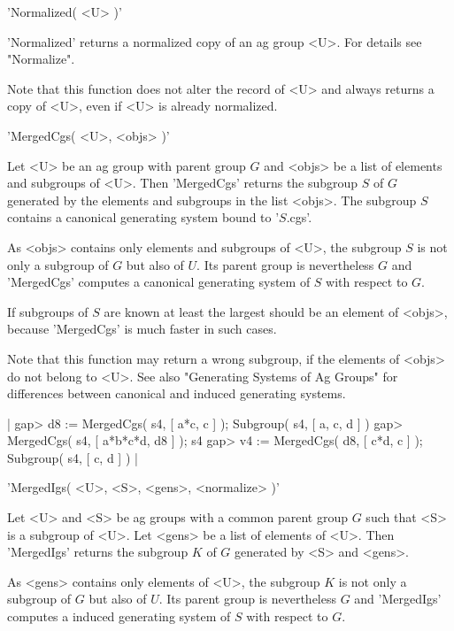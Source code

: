 
'Normalized( <U> )'

'Normalized' returns a normalized copy of  an  ag group <U>.  For details
see "Normalize".

Note that this  function does  not  alter  the record  of <U> and  always
returns a copy of <U>, even if <U> is already normalized.


'MergedCgs( <U>, <objs> )'

Let  <U> be an ag group  with parent group  $G$ and <objs>  be  a list of
elements and subgroups of <U>.  Then 'MergedCgs' returns the subgroup $S$
of $G$ generated  by  the elements and subgroups  in the list <objs>. The
subgroup $S$ contains a canonical generating system bound to '$S$.cgs'.

As <objs> contains only elements and subgroups  of <U>, the  subgroup $S$
is not only  a subgroup of $G$  but also  of  $U$.  Its  parent  group is
nevertheless $G$ and  'MergedCgs' computes a canonical  generating system
of $S$ with respect to $G$.

If subgroups of $S$ are known at least  the largest  should be an element
of <objs>, because 'MergedCgs' is much faster in such cases.

Note that this function may return a wrong subgroup,  if  the elements of
<objs> do not belong to <U>.  See also "Generating  Systems of Ag Groups"
for differences between canonical and induced generating systems.

|    gap> d8 := MergedCgs( s4, [ a*c, c ] );
    Subgroup( s4, [ a, c, d ] )
    gap> MergedCgs( s4, [ a*b*c*d, d8 ] );
    s4
    gap> v4 := MergedCgs( d8, [ c*d, c ] );
    Subgroup( s4, [ c, d ] ) |


'MergedIgs( <U>, <S>, <gens>, <normalize> )'

Let <U> and <S> be ag groups with a common parent group $G$ such that <S>
is a subgroup of <U>.   Let <gens> be a  list of elements of  <U>.   Then
'MergedIgs' returns the subgroup $K$ of $G$ generated by <S> and <gens>.


As <gens> contains only elements of  <U>, the subgroup  $K$ is not only a
subgroup of $G$ but also  of $U$.   Its parent  group is nevertheless $G$
and 'MergedIgs' computes a induced generating system of  $S$ with respect
to $G$.

